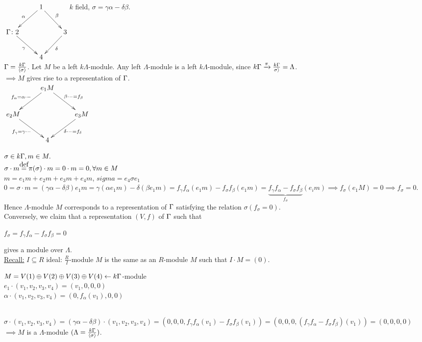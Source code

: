 \begin{exam}
	$\xymatrix{ & 1\ar[dl]_\alpha\ar[dr]^\beta & \\
		\G \colon 2\ar[dr]_\gamma & & 3\ar[dl]^\delta\\
		& 4 & }$\newline $k$ field, $\sigma = \gamma\alpha - \delta\beta$.\\\newline
		$ \Gamma=\frac{k\Gamma}{\langle\sigma\rangle}$. Let $M$ be a left $k\Lambda$-module. Any left $\Lambda$-module is a left $k\Lambda$-module, since $k\Gamma \xrightarrow{\pi} \frac{k\Gamma}{\large\sigma\rangle} = \Lambda$.\\
		$\implies M$ gives rise to a representation of $\Gamma$.\\
		
	$\xymatrix{ & e_1M\ar[dl]_{f_\alpha = \alpha\cdot-}\ar[dr]^{\beta\cdot-=f_\beta} & \\
	 e_2M\ar[dr]_{f_\gamma=\gamma\cdot-} & & e_3M\ar[dl]^{\delta\cdot-=f_\delta}\\
	& 4 & }$\newline

$\sigma\in k\Gamma, m \in M.$\\ $ \sigma\cdot m\defeq\pi(\sigma)\cdot m = 0\cdot m = 0, \forall m \in M$\\
$m=e_1m+e_2m+e_3m+e_4m$, $sigma = e_4\sigma e_1$\\
$0 = \sigma\cdot m = (\gamma\alpha-\delta\beta)e_1m = \gamma(\alpha e_1m)-\delta(\beta e_1m) = f_\gamma f_\alpha(e_1m)-f_\sigma f_\beta(e_1m) = \underbrace{f_\gamma f_\alpha-f_\sigma f_\beta}_{f_\sigma}(e_im) \implies f_\sigma(e_1M)=0 \implies f_\sigma = 0 $.\\
Hence $\Lambda$-module $M$ corresponds to a representation of $\Gamma$ satisfying the relation $\sigma(f_\sigma=0)$.\\
Conversely, we claim that a representation $(V,f)$ of $\Gamma$ 	such that
\begin{center}
	$f_\sigma=f_\gamma f_\alpha-f_\sigma f_\beta=0$
\end{center} 
 gives a module over $\Lambda$.\\\newline
\underline{Recall:} $I \subseteq R$ ideal: $\frac{R}{I}$-module $M$ is the same as an $R$-module $M$ such that $I\cdot M = (0)$.\\
\begin{center}
	$M = V(1) \oplus V(2) \oplus V(3) \oplus V(4) \leftarrow k\Gamma$-module\\
	$e_1\cdot(v_1,v_2,v_3,v_4)=(v_1,0,0,0)$\\
	$\alpha\cdot(v_1,v_2,v_3,v_4)=(0,f_\alpha(v_1),0,0)$\\
\end{center}
~\\$\sigma\cdot(v_1,v_2,v_3,v_4) = (\gamma\alpha-\delta\beta)\cdot(v_1,v_2,v_3,v_4) = (0,0,0,f_\gamma f_\alpha(v_1)-f_\sigma f_\beta(v_1)) =  (0,0,0,(f_\gamma f_\alpha-f_\sigma f_\beta)(v_1)) = (0,0,0,0) $\\\newline
$\implies M$ is a $\Lambda$-module $(\Lambda=\frac{k\Gamma}{\langle\sigma\rangle})$.
\end{exam}

